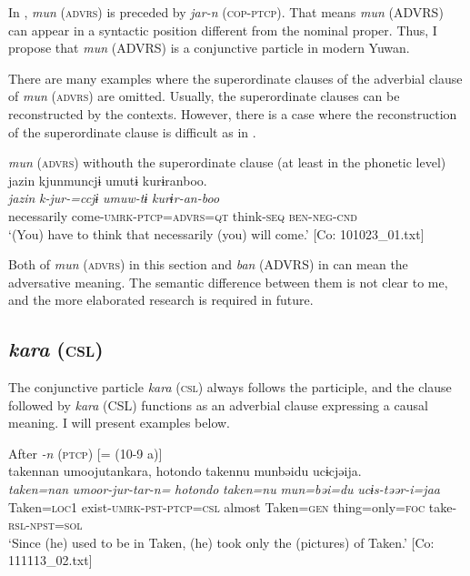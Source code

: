 In , \textit{mun} (\textsc{advrs}) is preceded by \textit{jar-n} (\textsc{cop}-\textsc{ptcp}). That means \textit{mun} (ADVRS) can appear in a syntactic position different from the nominal proper. Thus, I propose that \textit{mun} (ADVRS) is a conjunctive particle in modern Yuwan.

  There are many examples where the superordinate clauses of the adverbial clause of \textit{mun} (\textsc{advrs}) are omitted. Usually, the superordinate clauses can be reconstructed by the contexts. However, there is a case where the reconstruction of the superordinate clause is difficult as in .

\ea\label{ex:10.33}   \textit{mun} (\textsc{advrs}) withouth the superordinate clause (at least in the phonetic level)\\
      \glll    jazin  kjunmuncjɨ  umutɨ  kurɨranboo.\\
    \textit{jazin}  \textit{k-jur-=ccjɨ}  \textit{umuw-tɨ}  \textit{kurɨr-an-boo}\\
    necessarily  come-\textsc{umrk}-\textsc{ptcp}=\textsc{advrs}=\textsc{qt}  think-\textsc{seq}  \textsc{ben}-\textsc{neg}-\textsc{cnd}\\
\glt     ‘(You) have to think that necessarily (you) will come.’  [Co: 101023\_01.txt]
\z

Both of \textit{mun} (\textsc{advrs}) in this section and \textit{ban} (ADVRS) in  can mean the adversative meaning. The semantic difference between them is not clear to me, and the more elaborated research is required in future.

\subsection{\textit{kara} (\textsc{csl})}\label{sec:10.2.3}

The conjunctive particle \textit{kara} (\textsc{csl}) always follows the participle, and the clause followed by \textit{kara} (CSL) functions as an adverbial clause expressing a causal meaning. I will present examples below.

\ea\label{ex:10.34}  
\ea After \textit{{}-n} (\textsc{ptcp}) [= (10-9 a)]\\
      \glll    takennan  umoojutankara,  {\textbar}hotondo{\textbar}  takennu   munbəidu  ucɨcjəija.\\
    \textit{taken=nan}  \textit{umoor-jur-tar-n=}  \textit{hotondo}  \textit{taken=nu}  \textit{mun=bəi=du}  \textit{ucɨs-təər-i=jaa}\\
    Taken=\textsc{loc}1  exist-\textsc{umrk}-\textsc{pst}-\textsc{ptcp}=\textsc{csl}  almost  Taken=\textsc{gen}   thing=only=\textsc{foc}  take-\textsc{rsl}-\textsc{npst}=\textsc{sol}\\
\glt     ‘Since (he) used to be in Taken, (he) took only the (pictures) of Taken.’  [Co: 111113\_02.txt]

